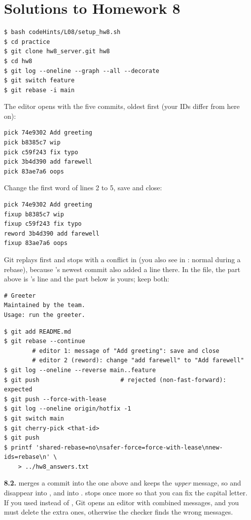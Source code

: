 \section*{Solutions to Homework 8}

\begin{lstlisting}
$ bash codeHints/L08/setup_hw8.sh
$ cd practice
$ git clone hw8_server.git hw8
$ cd hw8
$ git log --oneline --graph --all --decorate
$ git switch feature
$ git rebase -i main
\end{lstlisting}

The editor opens with the five commits, oldest first (your IDs differ from here on):

\begin{lstlisting}
pick 74e9302 Add greeting
pick b8385c7 wip
pick c59f243 fix typo
pick 3b4d390 add farewell
pick 83ae7a6 oops
\end{lstlisting}

Change the first word of lines 2 to 5, save and close:

\begin{lstlisting}
pick 74e9302 Add greeting
fixup b8385c7 wip
fixup c59f243 fix typo
reword 3b4d390 add farewell
fixup 83ae7a6 oops
\end{lstlisting}

Git replays  first and stops with a conflict in  (you also see  in : normal during a rebase), because 's newest commit also added a line there. In the file, the part above \code{=======} is 's line and the part below is yours; keep both:

\begin{lstlisting}
# Greeter
Maintained by the team.
Usage: run the greeter.
\end{lstlisting}

\begin{lstlisting}
$ git add README.md
$ git rebase --continue
        # editor 1: message of "Add greeting": save and close
        # editor 2 (reword): change "add farewell" to "Add farewell"
$ git log --oneline --reverse main..feature
$ git push                       # rejected (non-fast-forward): expected
$ git push --force-with-lease
$ git log --oneline origin/hotfix -1
$ git switch main
$ git cherry-pick <that-id>
$ git push
$ printf 'shared-rebase=no\nsafer-force=force-with-lease\nnew-ids=rebase\n' \
    > ../hw8_answers.txt
\end{lstlisting}

\textbf{8.2.}  merges a commit into the one above and keeps the \emph{upper} message, so  and  disappear into , and  into .  stops once more so that you can fix the capital letter. If you used  instead of , Git opens an editor with combined messages, and you must delete the extra ones, otherwise the checker finds the wrong messages.

